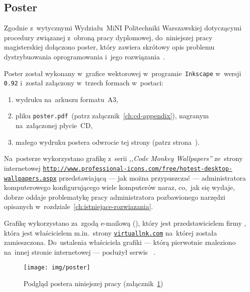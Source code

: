 \documentclass[thesis]{subfiles}
\begin{document}
\begin{appendices}


\chapter{Poster}
\label{ch:poster}

Zgodnie z~wytycznymi Wydziału~MiNI Politechniki Warszawskiej dotyczącymi procedury związanej z~obroną pracy dyplomowej, do~niniejszej pracy magisterskiej dołączono poster, który zawiera skrótowy opis problemu dystrybuowania oprogramowania i~jego rozwiązania~\cite{informacje-dot-obron}.

Poster został wykonany w~grafice wektorowej w~programie~\texttt{Inkscape} w~wersji \texttt{0.92} i~został załączony w~trzech formach w~postaci:
\begin{enumerate}
	\item wydruku na~arkuszu formatu~A3,
	\item pliku \mbox{\texttt{poster.pdf}}~(patrz załącznik~\ref{ch:cd-appendix}), nagranym na~załączonej płycie~CD,
	\item małego wydruku postera odwrocie tej strony (patrz strona~\pageref{fig:poster-preview}).
\end{enumerate}
Na~posterze wykorzystano grafikę z~serii \emph{,,Code Monkey Wallpapers''} ze~strony internetowej \texttt{\url{http://www.professional-icons.com/free/hotest-desktop-wallpapers.aspx}} przedstawiającą --- jak można przypuszczać --- administratora komputerowego konfigurującego wiele komputerów naraz, co,~jak się wydaje, dobrze oddaje problematykę pracy administratora pozbawionego narzędzi opisanych w~rozdziale~\ref{ch:istniejace-rozwiazania}.

Grafikę wykorzystano za~zgodą e-mailową  (), który jest przedstawicielem firmy , która jest właścicielem m.in.~strony \texttt{\url{virtuallnk.com}} na~której została zamieszczona. Do~ustalenia właściciela grafiki --- którą pierwotnie znaleziono na~innej stronie internetowej --- posłużył serwis ~\cite{tineye}.

\newpage
\begin{figure}[p]
	\centering
	\texttt{[image: img/poster]}
	\caption{Podgląd postera niniejszej pracy (załącznik~\ref{ch:poster})}
	\label{fig:poster-preview}
\end{figure}


\end{appendices}
\end{document}
